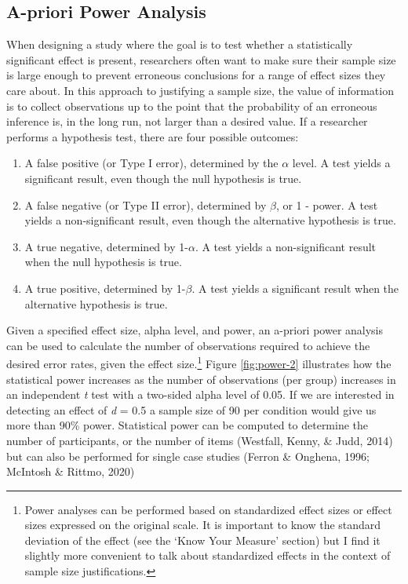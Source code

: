 \documentclass[
  english,
  ,jou, a4paper,floatsintext]{apa6}
\providecommand{\tightlist}{%
  \setlength{\itemsep}{0pt}\setlength{\parskip}{0pt}}
\begin{document}
\hypertarget{a-priori-power-analysis}{%
\subsection{A-priori Power Analysis}\label{a-priori-power-analysis}}

When designing a study where the goal is to test whether a statistically significant effect is present, researchers often want to make sure their sample size is large enough to prevent erroneous conclusions for a range of effect sizes they care about. In this approach to justifying a sample size, the value of information is to collect observations up to the point that the probability of an erroneous inference is, in the long run, not larger than a desired value. If a researcher performs a hypothesis test, there are four possible outcomes:

\begin{enumerate}
\def\labelenumi{\arabic{enumi}.}
\tightlist
\item
  A false positive (or Type I error), determined by the \(\alpha\) level. A test yields a significant result, even though the null hypothesis is true.
\item
  A false negative (or Type II error), determined by \(\beta\), or 1 - power. A test yields a non-significant result, even though the alternative hypothesis is true.
\item
  A true negative, determined by 1-\(\alpha\). A test yields a non-significant result when the null hypothesis is true.
\item
  A true positive, determined by 1-\(\beta\). A test yields a significant result when the alternative hypothesis is true.
\end{enumerate}

Given a specified effect size, alpha level, and power, an a-priori power analysis can be used to calculate the number of observations required to achieve the desired error rates, given the effect size.\footnote{Power analyses can be performed based on standardized effect sizes or effect sizes expressed on the original scale. It is important to know the standard deviation of the effect (see the `Know Your Measure' section) but I find it slightly more convenient to talk about standardized effects in the context of sample size justifications.} Figure \ref{fig:power-2} illustrates how the statistical power increases as the number of observations (per group) increases in an independent \emph{t} test with a two-sided alpha level of 0.05. If we are interested in detecting an effect of \emph{d} = 0.5 a sample size of 90 per condition would give us more than 90\% power. Statistical power can be computed to determine the number of participants, or the number of items (Westfall, Kenny, \& Judd, 2014) but can also be performed for single case studies (Ferron \& Onghena, 1996; McIntosh \& Rittmo, 2020)
\end{document}
